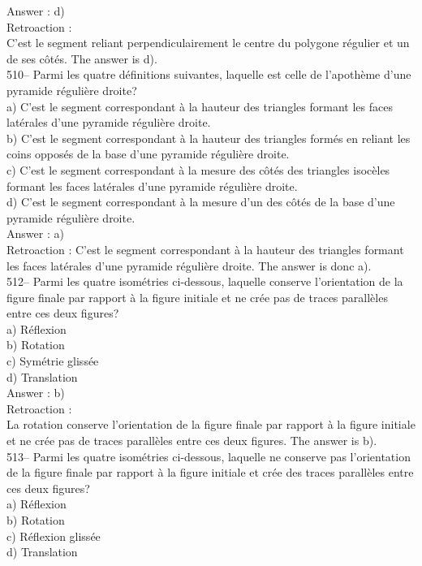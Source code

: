 ﻿\documentclass[letterpaper, 12pt]{article}
\begin{document}
Answer : d)\\

Retroaction :  \\
C'est le segment reliant perpendiculairement le centre du polygone
r\'egulier et un de ses c\^ot\'es.  The answer is d).\\

510-- Parmi les quatre d\'efinitions suivantes, laquelle est celle de
l'apoth\`eme d'une pyramide r\'eguli\`ere droite?\\
a) C'est le segment correspondant \`a la hauteur des triangles formant les
faces lat\'erales d'une pyramide r\'eguli\`ere droite.  \\
b) C'est le segment correspondant \`a la hauteur des triangles form\'es en
reliant les coins oppos\'es de la base d'une pyramide r\'eguli\`ere
droite.\\
c) C'est le segment correspondant \`a la mesure des c\^ot\'es des triangles
isoc\`eles formant les faces lat\'erales d'une pyramide r\'eguli\`ere
droite.\\
d) C'est le segment correspondant \`a la mesure d'un des c\^ot\'es de la
base d'une pyramide r\'eguli\`ere droite.\\

Answer : a)\\

Retroaction :
C'est le segment correspondant \`a la hauteur des triangles formant les
faces lat\'erales d'une pyramide r\'eguli\`ere droite.  The answer is
donc a).\\


512--  Parmi les quatre isom\'etries ci-dessous, laquelle conserve
l'orientation de la figure finale par rapport \`a la figure initiale et ne
cr\'ee pas de traces parall\`eles entre ces deux figures?\\
a) R\'eflexion\\
b) Rotation\\
c) Sym\'etrie gliss\'ee\\
d) Translation\\

Answer : b)\\

Retroaction :\\
La rotation conserve l'orientation de la figure finale par rapport \`a la
figure initiale et ne cr\'ee pas de traces parall\`eles entre ces deux
figures. The answer is b).\\

513--  Parmi les quatre isom\'etries ci-dessous, laquelle ne conserve pas
l'orientation de la figure finale par rapport \`a la figure initiale et
cr\'ee des traces parall\`eles entre ces deux figures?\\
a) R\'eflexion\\
b) Rotation\\
c) R\'eflexion gliss\'ee\\
d) Translation\\
\end{document}
